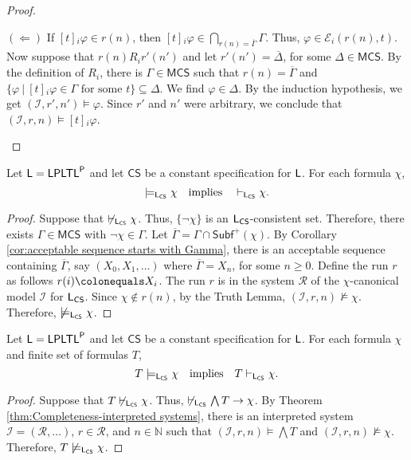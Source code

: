 \documentclass[envcountsect,envcountsame,oribibl,orivec]{llncs}
\newcommand{\LPLTLp}{\textsf{LPLTL}^{\sf P}}
\newcommand{\jbox}[1]{\left[#1\right]\!}
\newcommand{\CS}{\textsf{CS}}
\newcommand{\agent}{i}
\newcommand{\runs}{\mathcal{R}}
\newcommand{\system}{\mathcal{I}}
\newcommand{\evidence}{\mathcal{E}}
\newcommand{\N}{\mathbb{N}}
\renewcommand{\phi}{\varphi}
\newcommand{\Subf}{\mathsf{Subf}}
\newcommand{\MCS}{\mathsf{MCS}}
\begin{document}
\begin{proof}
\begin{itemize}
		$(\Leftarrow)$ If $\jbox{t}_\agent \phi \in r(n)$, then $\jbox{t}_\agent \phi \in \bigcap_{r(n) = \overline{\Gamma}} \Gamma$. Thus, $\phi \in \evidence_\agent (r(n),t)$. 
		Now suppose that $r(n) R_\agent  r'(n')$ and let $r'(n') = \overline{\Delta}$, for some $\Delta \in \MCS$. By the definition of $R_\agent$, there is $\Gamma \in \MCS$ such that $r(n) = \overline{\Gamma}$ and  
		$\{ \phi \ |\  \jbox{t}_\agent \phi \in \Gamma   \text{ for some $t$}\} \subseteq \Delta$. We find $\phi \in \Delta$. By the induction hypothesis, we get $(\system, r', n') \models \phi$. Since $r'$ and $n'$ were arbitrary, we conclude that $(\system, r, n) \models \jbox{t}_\agent \phi$. 
	\end{itemize}
\end{proof}


\begin{theorem}[Completeness]\label{thm:Completeness-interpreted systems}
	Let ${\sf L} = \LPLTLp$ and let $\CS$ be a constant specification for ${\sf L}$. For each formula $\chi$,
	\[
	\models_{{\sf L}_\CS}  \chi  \quad\text{implies}\quad  \vdash_{{\sf L}_\CS} \chi.
	\]
\end{theorem}
\begin{proof}
	Suppose that $\not\vdash_{{\sf L}_\CS} \chi$. Thus, $\{ \neg \chi\}$ is an ${\sf L}_\CS$-consistent set.
	Therefore, there exists $\Gamma \in \MCS$ with $\neg \chi \in \Gamma$. Let $\overline{\Gamma} = \Gamma \cap  \Subf^+(\chi)$.
	By Corollary \ref{cor:acceptable sequence starts with Gamma}, there is an acceptable sequence containing $\overline{\Gamma}$, say $(X_{0},X_1,\ldots)$ where $\overline{\Gamma} = X_n$, for some $n \geq 0$. Define the run $r$ as follows $r(i) \colonequals X_i$. The run $r$ is in the system $\runs$ of the $\chi$-canonical model $\system$ for ${\sf L}_\CS$. 
	Since $\chi \not \in r(n)$, by the Truth Lemma, $(\system, r, n) \not\models \chi$. Therefore, $\not\models_{{\sf L}_\CS} \chi$.  
\end{proof}

\begin{theorem}[Completeness]\label{thm:Weak Completeness-interpreted systems}
	Let ${\sf L} = \LPLTLp$ and let $\CS$ be a constant specification for ${\sf L}$. For each formula $\chi$ and finite set of formulas $T$,
	\[
	T \models_{{\sf L}_\CS}  \chi  \quad\text{implies}\quad  T \vdash_{{\sf L}_\CS} \chi.
	\]
\end{theorem}
\begin{proof}
	Suppose that $T \not \vdash_{{\sf L}_\CS} \chi$. Thus, $\not \vdash_{{\sf L}_\CS} \bigwedge T \to \chi$. By Theorem \ref{thm:Completeness-interpreted systems}, there is an interpreted system $\system = (\runs, \ldots)$, $r \in \runs$, and $n \in \N$ such that $(\system, r, n) \models \bigwedge T$ and $(\system, r, n) \not\models \chi$. Therefore, $T \not \models_{{\sf L}_\CS} \chi$.  
\end{proof}
\end{document}
